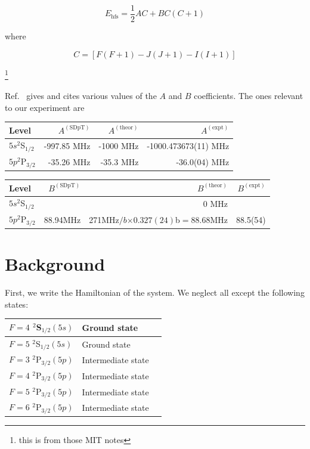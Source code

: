 \begin{equation}
E_{\mathrm{hfs}}=\frac{1}{2}AC+BC(C+1)
\end{equation}

where 

\begin{equation}
C=[F(F+1)-J(J+1)-I(I+1)]
\end{equation}

\footnote{this is from those MIT notes}

Ref.\ \cite{safronova2photon} gives and cites various values of the $A$ and $B$ coefficients. The ones relevant to our experiment are 


\begin{center}
\begin{tabular}{|l|r|r|r|}
\hline
Level &  $A^{\mathrm{(SDpT)}}$ &$A^{\mathrm{(theor)}}$ & $A^{\mathrm{(expt)}}$ \\ \hline \hline
$5s ^2$S$_{1/2}$&-997.85 MHz& -1000 MHz& -1000.473673(11) MHz\\ \hline
$5p ^2$P$_{3/2}$&-35.26 MHz&-35.3 MHz&-36.0(04) MHz\\ \hline
\end{tabular}
\end{center}

\begin{center}
\begin{tabular}{|l|r|r|r|}
\hline
Level &  $B^{\mathrm{(SDpT)}}$ &$B^{\mathrm{(theor)}}$ & $B^{\mathrm{(expt)}}$ \\ \hline \hline
$5s ^2$S$_{1/2}$&&0  MHz&  \\ \hline
$5p ^2$P$_{3/2}$&88.94MHz&271MHz$/b$$\times 0.327(24)$b$=88.68$MHz&88.5(54) \\ \hline
\end{tabular}
\end{center}


\section{Background}

First, we write the Hamiltonian of the system. We neglect all except the following states: %
\begin{center}
\begin{tabular}{|l|l|||r|}
\hline
$F=4$ $^2$S$_{1/2} (5s)$ & Ground state  \\ \hline
$F=5$ $^2$S$_{1/2} (5s)$ & Ground state  \\ \hline
$F=3$ $^2$P$_{3/2} (5p)$ & Intermediate state  \\ \hline
$F=4$ $^2$P$_{3/2} (5p)$ & Intermediate state  \\ \hline
$F=5$ $^2$P$_{3/2} (5p)$ & Intermediate state  \\ \hline
$F=6$ $^2$P$_{3/2} (5p)$ & Intermediate state  \\ \hline
\end{tabular}
\end{center}

